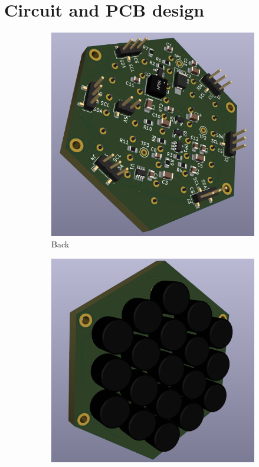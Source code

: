 \chapter{Circuit and PCB design}
%




%
\begin{figure}[ht]
  \begin{subfigure}[b]{0.49\textwidth}
    \includegraphics[width=\textwidth]{src/assets/pictures/circuit/pcb_back.png}
    \caption{Back}
    \label{fig:pcb:back}
  \end{subfigure}
  \hfill
  \begin{subfigure}[b]{0.49\textwidth}
    \includegraphics[width=\textwidth]{src/assets/pictures/circuit/pcb_front.png}

\end{subfigure}
\end{figure}
